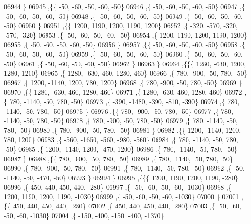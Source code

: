 \begin{DoxyCode}
06944     \}
06945    ,\{\{   -50,   -60,   -50,   -60,   -50\}
06946     ,\{   -50,   -60,   -50,   -60,   -50\}
06947     ,\{   -50,   -60,   -50,   -60,   -50\}
06948     ,\{   -50,   -60,   -50,   -60,   -50\}
06949     ,\{   -50,   -60,   -50,   -60,   -50\}
06950     \}
06951    ,\{\{  1200,  1190,  1200,  1190,  1200\}
06952     ,\{  -320,  -570,  -320,  -570,  -320\}
06953     ,\{   -50,   -60,   -50,   -60,   -50\}
06954     ,\{  1200,  1190,  1200,  1190,  1200\}
06955     ,\{   -50,   -60,   -50,   -60,   -50\}
06956     \}
06957    ,\{\{   -50,   -60,   -50,   -60,   -50\}
06958     ,\{   -50,   -60,   -50,   -60,   -50\}
06959     ,\{   -50,   -60,   -50,   -60,   -50\}
06960     ,\{   -50,   -60,   -50,   -60,   -50\}
06961     ,\{   -50,   -60,   -50,   -60,   -50\}
06962     \}
06963    \}
06964   ,\{\{\{  1280,  -630,  1200,  1280,  1200\}
06965     ,\{  1280,  -630,   460,  1280,   460\}
06966     ,\{   780,  -900,   -50,   780,   -50\}
06967     ,\{  1200, -1140,  1200,   780,  1200\}
06968     ,\{   780,  -900,   -50,   780,   -50\}
06969     \}
06970    ,\{\{  1280,  -630,   460,  1280,   460\}
06971     ,\{  1280,  -630,   460,  1280,   460\}
06972     ,\{   780, -1140,   -50,   780,   -50\}
06973     ,\{  -390, -1480,  -390,  -810,  -390\}
06974     ,\{   780, -1140,   -50,   780,   -50\}
06975     \}
06976    ,\{\{   780,  -900,   -50,   780,   -50\}
06977     ,\{   780, -1140,   -50,   780,   -50\}
06978     ,\{   780,  -900,   -50,   780,   -50\}
06979     ,\{   780, -1140,   -50,   780,   -50\}
06980     ,\{   780,  -900,   -50,   780,   -50\}
06981     \}
06982    ,\{\{  1200, -1140,  1200,   780,  1200\}
06983     ,\{  -560, -1650,  -560,  -980,  -560\}
06984     ,\{   780, -1140,   -50,   780,   -50\}
06985     ,\{  1200, -1140,  1200,  -470,  1200\}
06986     ,\{   780, -1140,   -50,   780,   -50\}
06987     \}
06988    ,\{\{   780,  -900,   -50,   780,   -50\}
06989     ,\{   780, -1140,   -50,   780,   -50\}
06990     ,\{   780,  -900,   -50,   780,   -50\}
06991     ,\{   780, -1140,   -50,   780,   -50\}
06992     ,\{   -50, -1140,   -50,  -470,   -50\}
06993     \}
06994    \}
06995   ,\{\{\{  1200,  1190,  1200,  1190,  -280\}
06996     ,\{   450,   440,   450,   440,  -280\}
06997     ,\{   -50,   -60,   -50,   -60, -1030\}
06998     ,\{  1200,  1190,  1200,  1190, -1030\}
06999     ,\{   -50,   -60,   -50,   -60, -1030\}
07000     \}
07001    ,\{\{   450,   440,   450,   440,  -280\}
07002     ,\{   450,   440,   450,   440,  -280\}
07003     ,\{   -50,   -60,   -50,   -60, -1030\}
07004     ,\{  -150,  -400,  -150,  -400, -1370\}

\end{DoxyCode}
